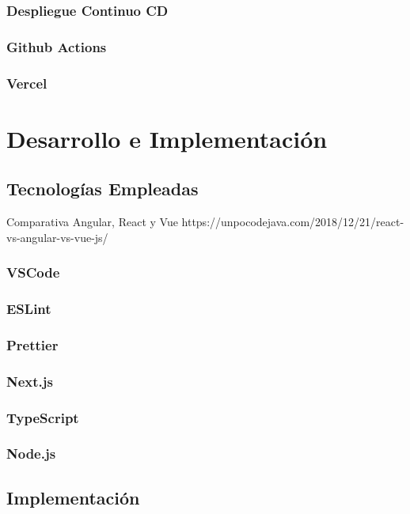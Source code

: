 \documentclass[12pt,twoside,titlepage]{report}
\begin{document}
\subsubsection{Despliegue Continuo CD}
\subsubsection{Github Actions}
\subsubsection{Vercel}

\section{Desarrollo e Implementación}

\subsection{Tecnologías Empleadas}

Comparativa Angular, React y Vue
https://unpocodejava.com/2018/12/21/react-vs-angular-vs-vue-js/

\subsubsection{VSCode}
\subsubsection{ESLint}
\subsubsection{Prettier}

\subsubsection{Next.js}

\subsubsection{TypeScript}

\subsubsection{Node.js}



\subsection{Implementación}
\end{document}

